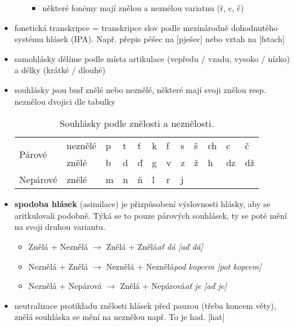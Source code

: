 \documentclass{memoir}
\begin{document}
\begin{itemize}
\begin{enumerate}
\begin{itemize}
				\item některé fonémy mají znělou a neznélou variatnu (ř, c, č)
			\end{itemize}
		\end{enumerate}
	\item fonetická transkripce = transkripce slov podle mezinárodně dohodnutého systému hlásek (IPA). Např. přepis pěšec na [pješec] nebo vztah na [fstach]
	\item samohlásky dělíme podle místa artikulace (vepředu / vzadu, vysoko / nízko) a délky (krátké / dlouhé)
	\item souhlásky jsou buď znělé nebo neznělé, některé mají svoji znělou resp. neznělou dvojici dle tabulky
	\begin{table}[h]
		\centering
		\begin{tabular}{|l|l|l|l|l|l|l|l|l|l|l|l|}
			\hline
			\multirow{2}{*}{Párové} & neznělé & p & t & ť & k & f & s & š & ch & c  & č  \\

			& znělé   & b & d & ď & g & v & z & ž & h  & dz & dž\\
			\hline
			Nepárové                & znělé   & m & n & ň & l & r & j &   &    &    &    \\
			\hline
		\end{tabular}
		\caption{Souhlásky podle znělosti a neznělosti.}
	\end{table}
	\item \textbf{spodoba hlásek} (asimilace) je přizpůsobení výslovnosti hlásky, aby se aritkulovali podobně. Týká se to pouze párových souhlásek, ty se poté mění na svoji druhou variantu.
	\begin{itemize}
		\item Znělá + Neznělá $\rightarrow$ Znělá + Znělá\hfill\textit{ať dá [aď dá]}
		\item Neznělá + Znělá $\rightarrow$ Neznělá + Neznělá\hfill\textit{pod kopcem [pot kopcem]}
		\item Neznělá + Nepárová $\rightarrow$ Znělá + Nepárová\hfill\textit{ať je [aď je]}
	\end{itemize}
	\item neutralizace protikladu znělosti hlásek před pauzou (třeba koncem věty), znělá souhláska se mění na neznělou např. To je had. [hat]
	\end{itemize}
\end{document}
